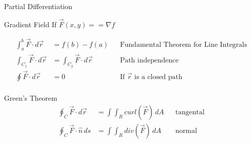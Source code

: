 \begin{section}{Partial Differentiation}
\begin{section}{Gradient Field}
    If $\vec{F}(x,y) == \nabla{f}$

    \begin{align*}
      \int_a^b \vec{F} \cdot d\vec{r} &= f(b) - f(a) &&
      \text{Fundamental Theorem for Line Integrals}\\
      \int_{C_1} \vec{F} \cdot d\vec{r} &= \int_{C_2} \vec{F} \cdot d\vec{r} &&
      \text{Path independence}\\
      \oint \vec{F} \cdot d\vec{r} &= 0 &&
      \text{If $\vec{r}$ is a closed path}\\
    \end{align*}
  \end{section}

  \begin{section}{Green's Theorem}
    \begin{align*}
      \oint_C \vec{F} \cdot d\vec{r} &= \int\int_R curl(\vec{F})\,dA && \text{tangental} \\
      \oint_C \vec{F} \cdot \hat{n}\, ds &= \int\int_R div(\vec{F})\,dA && \text{normal} \\
    \end{align*}
  \end{section}



\end{section}
